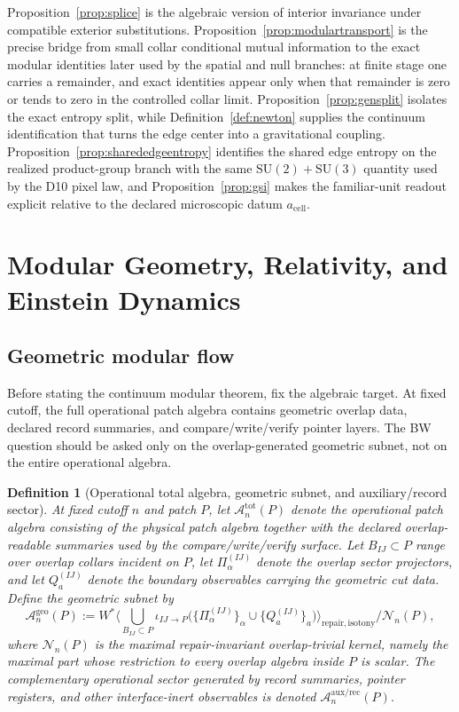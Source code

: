 \documentclass[11pt]{article}
\newtheorem{definition}[theorem]{Definition}
\newcommand{\SU}{\mathrm{SU}}
\begin{document}
Proposition~\ref{prop:splice} is the algebraic version of interior invariance under compatible exterior substitutions. Proposition~\ref{prop:modulartransport} is the precise bridge from small collar conditional mutual information to the exact modular identities later used by the spatial and null branches: at finite stage one carries a remainder, and exact identities appear only when that remainder is zero or tends to zero in the controlled collar limit. Proposition~\ref{prop:gensplit} isolates the exact entropy split, while Definition~\ref{def:newton} supplies the continuum identification that turns the edge center into a gravitational coupling.
Proposition~\ref{prop:sharededgeentropy} identifies the shared edge entropy on the realized product-group branch with the same \(\SU(2)+\SU(3)\) quantity used by the D10 pixel law, and Proposition~\ref{prop:gsi} makes the familiar-unit readout explicit relative to the declared microscopic datum \(a_{\mathrm{cell}}\).

\section{Modular Geometry, Relativity, and Einstein Dynamics}\label{sec:gravity}

\subsection{Geometric modular flow}

Before stating the continuum modular theorem, fix the algebraic target. At fixed cutoff, the full operational patch algebra contains geometric overlap data, declared record summaries, and compare/write/verify pointer layers. The BW question should be asked only on the overlap-generated geometric subnet, not on the entire operational algebra.

\begin{definition}[Operational total algebra, geometric subnet, and auxiliary/record sector]\label{def:geosubnet}
At fixed cutoff \(n\) and patch \(P\), let \(\mathcal A_n^{\mathrm{tot}}(P)\) denote the operational patch algebra consisting of the physical patch algebra together with the declared overlap-readable summaries used by the compare/write/verify surface. Let \(B_{IJ}\subset P\) range over overlap collars incident on \(P\), let \(\Pi_\alpha^{(IJ)}\) denote the overlap sector projectors, and let \(Q_a^{(IJ)}\) denote the boundary observables carrying the geometric cut data. Define the geometric subnet by
\[
\mathcal A_n^{\mathrm{geo}}(P)
:=
W^\ast\!\Big\langle
\bigcup_{B_{IJ}\subset P}
\iota_{IJ\to P}\!\bigl(
\{\Pi_\alpha^{(IJ)}\}_\alpha\cup\{Q_a^{(IJ)}\}_a
\bigr)
\Big\rangle_{\mathrm{repair,isotony}}
\Big/
\mathcal N_n(P),
\]
where \(\mathcal N_n(P)\) is the maximal repair-invariant overlap-trivial kernel, namely the maximal part whose restriction to every overlap algebra inside \(P\) is scalar. The complementary operational sector generated by record summaries, pointer registers, and other interface-inert observables is denoted \(\mathcal A_n^{\mathrm{aux/rec}}(P)\).
\end{definition}
\end{document}
